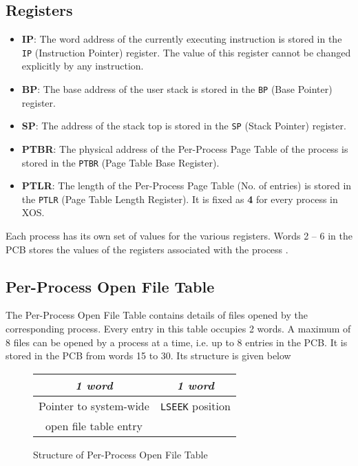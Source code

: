 \documentclass[10pt]{report}
\begin{document}
	  \subsection{Registers}
	  \label{sec:registers} 
\begin{itemize}
	\item \textbf{IP}: The word address of the currently executing instruction is stored in the \texttt{IP} (Instruction Pointer) register. The value of this register cannot be changed explicitly by any instruction. 
	
	\item \textbf{BP}:   The base address of the user stack is stored in the \texttt{BP} (Base Pointer) register. 
	\item \textbf{SP}: The address of the stack top is stored in the \texttt{SP} (Stack Pointer) register. 
	\item \textbf{PTBR}: The physical address of the Per-Process Page Table of the process is stored in the \texttt{PTBR} (Page Table Base Register).
	\item  \textbf{PTLR}: The length of the Per-Process Page Table (No. of entries) is stored in the \texttt{PTLR} (Page Table Length Register). It is fixed as \textbf{4} for every process in XOS. 
	
\end{itemize}
Each process has its own set of values for the various registers. Words  2	 -- 6 in the PCB stores the values of the registers associated with the process .
	
	
\subsection{Per-Process Open File Table} 
\label{sec:processfile table}
	 
	  The Per-Process Open File Table contains details of files opened by the corresponding process. Every entry in this table occupies 2 words. A maximum of 8 files can be opened by a process at a time, i.e. up to 8 entries in the PCB. It is stored in the PCB from words 15 to 30. Its structure is given below


		\begin{figure}[htp!]
		\centering
		\begin{tabular}{|c|c|}
			\textit{1 word} & \textit{1 word} \\
			\hline
			Pointer to system-wide & \texttt{LSEEK} position\\ open file table entry &  \\
			\hline
		\end{tabular}
		\caption{Structure of Per-Process Open File Table}
		\label{fig:processfile table}
	\end{figure}
	
\end{document}
